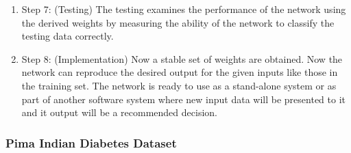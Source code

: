 \documentclass[a4paper,14pt,onecolumn]{article}
\begin{document}
\begin{enumerate}
\item Step 7: (Testing) The testing examines the performance of the network using the derived weights by measuring the ability of the network to classify the testing data correctly. 

\item Step 8: (Implementation) Now a stable set of weights are obtained. Now the network can reproduce the desired output for the given inputs like those in the training set. The network is ready to use as a stand-alone system or as part of another software system where new input data will be presented to it and it output will be a recommended decision.  

\end{enumerate}



\newpage
\subsubsection{Pima Indian Diabetes Dataset}
\end{document}
